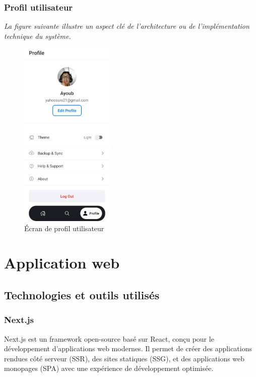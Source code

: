 \subsubsection{Profil utilisateur}
\noindent
\textit{La figure suivante illustre  un aspect clé de l'architecture ou de l'implémentation technique du système.}
\begin{figure}[H]
    \centering
    \includegraphics[width=0.4\textwidth]{assets/docs/mobile/profile-screen.png}
    \caption{Écran de profil utilisateur}
    \label{fig:mobile-profile}
\end{figure}

\section{Application web}

\subsection{Technologies et outils utilisés}

\subsubsection{Next.js}
Next.js est un framework open-source basé sur React, conçu pour le développement d'applications web modernes. Il permet de créer des applications rendues côté serveur (SSR), des sites statiques (SSG), et des applications web monopages (SPA) avec une expérience de développement optimisée.

